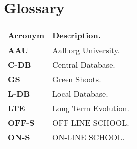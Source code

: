 \chapter*{Glossary} \label{chap:glossary}

\begin{table}[H]
	\centering
	\begin{tabular}{l|l}
		\toprule
		\textbf{Acronym} & \textbf{Description.} \\ \midrule
		\textbf{AAU} & Aalborg University. \\
		\textbf{C-DB} & Central Database.  \\
		\textbf{GS} & Green Shoots. \\
		\textbf{L-DB} & Local Database. \\
		\textbf{LTE} & Long Term Evolution. \\
		\textbf{OFF-S} & OFF-LINE SCHOOL. \\
		\textbf{ON-S} & ON-LINE SCHOOL. \\
		\bottomrule
	\end{tabular}
\end{table}



\clearpage